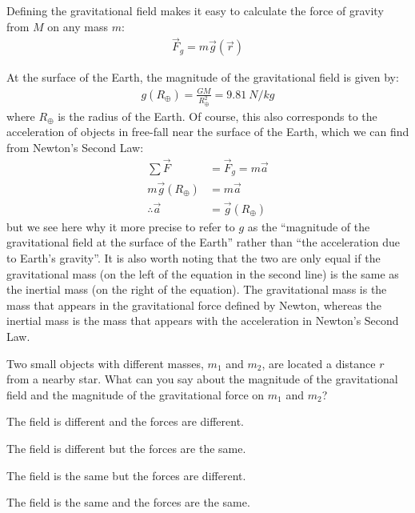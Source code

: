 Defining the gravitational field makes it easy to calculate the force of gravity from $M$ on any mass $m$:
\begin{align*}
\vec F_g = m\vec g(\vec r)
\end{align*}

At the surface of the Earth, the magnitude of the gravitational field is given by:
\begin{align*}
g(R_\oplus)=\frac{GM}{R_\oplus^2}=\SI{9.81}{N/kg}
\end{align*}
where $R_\oplus$ is the radius of the Earth. Of course, this also corresponds to the acceleration of objects in free-fall near the surface of the Earth, which we can find from Newton's Second Law:
\begin{align*}
\sum \vec F &= \vec F_g = m\vec a\\
m\vec g(R_\oplus)&= m\vec a\\
\therefore \vec a &= \vec g(R_\oplus)
\end{align*}
but we see here why it more precise to refer to $g$ as the ``magnitude of the gravitational field at the surface of the Earth'' rather than ``the acceleration due to Earth's gravity''. It is also worth noting that the two are only equal if the gravitational mass (on the left of the equation in the second line) is the same as the inertial mass (on the right of the equation). The gravitational mass is the mass that appears in the gravitational force defined by Newton, whereas the inertial mass is the mass that appears with the acceleration in Newton's Second Law.

\begin{checkpoint}
\begin{MCquestion}{Two small objects with different masses, $m_1$ and $m_2$, are located a distance $r$ from a nearby star. What can you say about the magnitude of the gravitational field and the magnitude of the gravitational force on $m_1$ and $m_2$?}
\item The field is different and the forces are different. 
\item The field is different but the forces are the same.
\item The field is the same but the forces are different.\correct
\item The field is the same and the forces are the same. 
\end{MCquestion}
\end{checkpoint}

